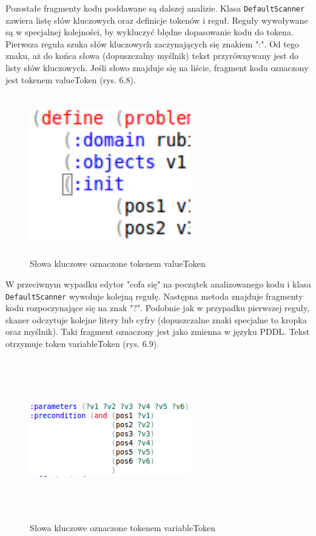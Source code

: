 Pozostałe fragmenty kodu poddawane są dalszej analizie. Klasa \texttt{DefaultScanner} zawiera listę słów kluczowych oraz definicje tokenów i reguł. Reguły wywoływane są w specjalnej kolejności, by wykluczyć błędne dopasowanie kodu do tokena. Pierwsza reguła szuka słów kluczowych zaczynających się znakiem ":".  Od tego znaku, aż do końca słowa (dopuszczalny myślnik) tekst przyrównywany jest do listy słów kluczowych. Jeśli słowo znajduje się na liście, fragment kodu oznaczony jest tokenem valueToken (rys. 6.8).

\begin{figure}[h]
  \centering
    \includegraphics[width=7cm,height=7cm,keepaspectratio]{img/values-color.png}
    \caption{Słowa kluczowe oznaczone tokenem valueToken}
    \label{ana_structure}
\end{figure}

 W przeciwnym wypadku edytor "cofa się" na początek analizowanego kodu i klasa \texttt{DefaultScanner} wywołuje kolejną regułę. Następna metoda znajduje fragmenty kodu rozpoczynające się na znak "?".  Podobnie jak w przypadku pierwszej reguły, skaner odczytuje kolejne litery lub cyfry (dopuszczalne znaki specjalne to kropka oraz myślnik). Taki fragment oznaczony jest jako zmienna w języku PDDL. Tekst otrzymuje token variableToken (rys. 6.9).

\begin{figure}[h]
  \centering
    \includegraphics[width=7cm,height=7cm,keepaspectratio]{img/variable-color.png}
    \caption{Słowa kluczowe oznaczone tokenem variableToken}
    \label{ana_structure}
\end{figure}

